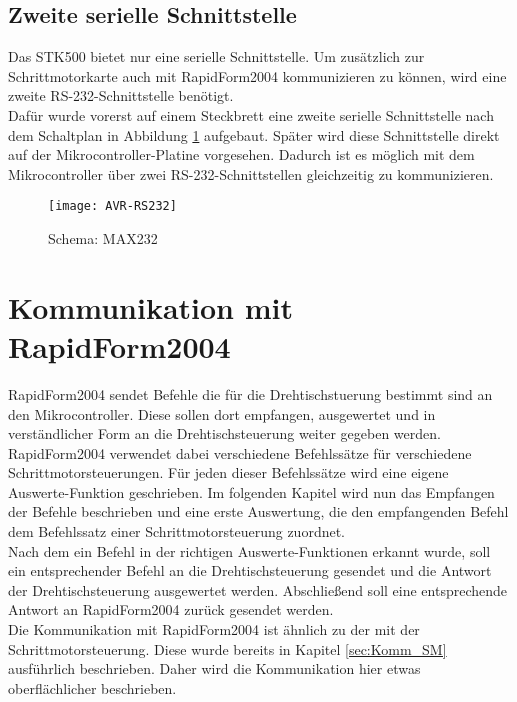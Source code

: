 \subsection{Zweite serielle Schnittstelle}
Das STK500 bietet nur eine serielle Schnittstelle. Um zusätzlich zur Schrittmotorkarte auch mit RapidForm2004 kommunizieren zu können, wird eine zweite RS-232-Schnittstelle benötigt.\\
Dafür wurde vorerst auf einem Steckbrett eine zweite serielle Schnittstelle nach dem Schaltplan in Abbildung \ref{fig:MAX232} aufgebaut. Später wird diese Schnittstelle direkt auf der Mikrocontroller-Platine vorgesehen.
Dadurch ist es möglich mit dem Mikrocontroller über zwei RS-232-Schnittstellen gleichzeitig zu kommunizieren.
\begin{figure}[h]
\centering
\texttt{[image: AVR-RS232]}
\caption{Schema: MAX232}
\label{fig:MAX232}
\citep{uC:RS232}
\end{figure}

\section{Kommunikation mit RapidForm2004}
\label{sec:Komm_RF2004}
RapidForm2004 sendet Befehle die für die Drehtischstuerung bestimmt sind an den Mikrocontroller. Diese sollen dort empfangen, ausgewertet und in verständlicher Form an die Drehtischsteuerung weiter gegeben werden. RapidForm2004 verwendet dabei verschiedene Befehlssätze für verschiedene Schrittmotorsteuerungen. Für jeden dieser Befehlssätze wird eine eigene Auswerte-Funktion geschrieben. Im folgenden Kapitel wird nun das Empfangen der Befehle beschrieben und eine erste Auswertung, die den empfangenden Befehl dem Befehlssatz einer Schrittmotorsteuerung zuordnet.\\
Nach dem ein Befehl in der richtigen Auswerte-Funktionen erkannt wurde, soll ein entsprechender Befehl an die Drehtischsteuerung gesendet und die Antwort der Drehtischsteuerung ausgewertet werden. Abschließend soll eine entsprechende Antwort an RapidForm2004 zurück gesendet werden.\\
Die Kommunikation mit RapidForm2004 ist ähnlich zu der mit der Schrittmotorsteuerung. Diese wurde bereits in Kapitel \ref{sec:Komm_SM} ausführlich beschrieben. Daher wird die Kommunikation hier etwas oberflächlicher beschrieben.
